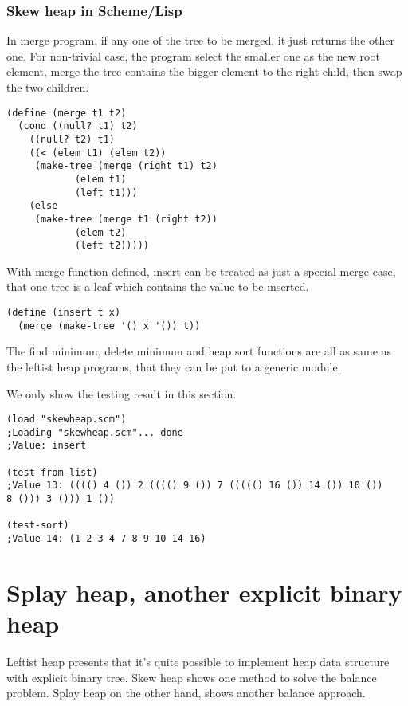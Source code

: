 \documentclass{article}
\begin{document}
\subsubsection*{Skew heap in Scheme/Lisp}

In merge program, if any one of the tree to be merged, it just returns the
other one. For non-trivial case, the program select the smaller one
as the new root element, merge the tree contains the bigger element
to the right child, then swap the two children.

\lstset{language = lisp}
\begin{lstlisting}
(define (merge t1 t2)
  (cond ((null? t1) t2)
	((null? t2) t1)
	((< (elem t1) (elem t2))
	 (make-tree (merge (right t1) t2)
		    (elem t1)
		    (left t1)))
	(else
	 (make-tree (merge t1 (right t2))
		    (elem t2)
		    (left t2)))))
\end{lstlisting}

With merge function defined, insert can be treated as just a special
merge case, that one tree is a leaf which contains the value to be
inserted.

\begin{lstlisting}
(define (insert t x)
  (merge (make-tree '() x '()) t))
\end{lstlisting}

The find minimum, delete minimum and heap sort functions are all
as same as the leftist heap programs, that they can be put to
a generic module.

We only show the testing result in this section.

\begin{lstlisting}
(load "skewheap.scm")
;Loading "skewheap.scm"... done
;Value: insert

(test-from-list)
;Value 13: (((() 4 ()) 2 (((() 9 ()) 7 ((((() 16 ()) 14 ()) 10 ())
8 ())) 3 ())) 1 ())

(test-sort)
;Value 14: (1 2 3 4 7 8 9 10 14 16)
\end{lstlisting}


\section{Splay heap, another explicit binary heap}
\label{splayheap}

Leftist heap presents that it's quite possible to implement
heap data structure with explicit binary tree. Skew heap
shows one method to solve the balance problem. Splay heap
on the other hand, shows another balance approach.
\end{document}
